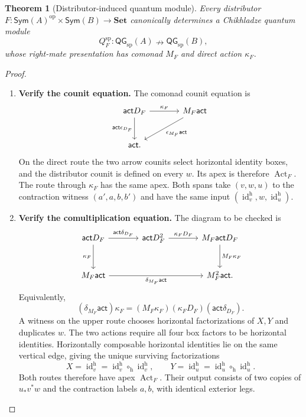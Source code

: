 \documentclass[oneside]{article}
\newcommand{\Sym}{\mathsf{Sym}}
\newcommand{\QG}{\mathsf{QG}}
\newcommand{\id}{\operatorname{id}}
\newcommand{\op}{\mathrm{op}}
\newcommand{\xnrightarrow}[1]{\mathrel{\overset{#1}{\nrightarrow}}}
\newcommand{\act}{\mathsf{act}}
\theoremstyle{plain}
\newtheorem{theorem}{Theorem}[section]
\theoremstyle{definition}
\theoremstyle{remark}
\begin{document}
\begin{theorem}[Distributor-induced quantum module]
\label{thm:cgqg-distributor-qmodule}
Every distributor \(F:\Sym(A)^\op\times \Sym(B)\to\mathbf{Set}\) canonically
determines a Chikhladze quantum module
\[
 Q_F^{\mathrm{sp}}:
 \QG_{\mathrm{sp}}(A)\xnrightarrow{}\QG_{\mathrm{sp}}(B),
\]
whose right-mate presentation has comonad \(M_F\) and direct action
\(\kappa_F\).
\end{theorem}
\begin{proof}
    \leavevmode
    \begin{enumerate}[beginpenalty=10000]
        \item \textbf{Verify the counit equation.}
        The comonad counit equation is
        \[
        \begin{tikzcd}[column sep=large,row sep=large]
        \act D_F\arrow[r,"\kappa_F"]\arrow[d,"\act\epsilon_{D_F}"']
          &M_F\act\arrow[dl,"\epsilon_{M_F}\act"]\\
        \act.&
        \end{tikzcd}
        \]
        On the direct route the two arrow counits select horizontal
        identity boxes, and the distributor counit is defined on every
        \(w\). Its apex is therefore \(\operatorname{Act}_F\).
        The route through \(\kappa_F\) has the same apex. Both spans
        take \((v,w,u)\) to the contraction witness \((a',a,b,b')\)
        and have the same input \((\id_v^{\mathrm h},w,\id_u^{\mathrm h})\).

        \item \textbf{Verify the comultiplication equation.}
        The diagram to be checked is
        \[
        \begin{tikzcd}[column sep=large,row sep=large]
        \act D_F\arrow[r,"\act\delta_{D_F}"]\arrow[d,"\kappa_F"']
          &\act D_F^2\arrow[r,"\kappa_F D_F"]
          &M_F\act D_F\arrow[d,"M_F\kappa_F"]\\
        M_F\act\arrow[rr,"\delta_{M_F}\act"']&&M_F^2\act.
        \end{tikzcd}
        \]
        Equivalently,
        \begin{equation}
        (\delta_{M_F}\act)\kappa_F
          =(M_F\kappa_F)(\kappa_FD_F)(\act\delta_{D_F}).
        \label{eq:cgqg-direct-action-comultiplication}
        \end{equation}
        A witness on the upper route chooses horizontal factorizations
        of \(X,Y\) and duplicates \(w\). The two actions require all
        four box factors to be horizontal identities. Horizontally
        composable horizontal identities lie on the same vertical edge,
        giving the unique surviving factorizations
        \[
        X=\id_v^{\mathrm h}=\id_v^{\mathrm h}\circ_{\mathrm h}\id_v^{\mathrm h},\qquad
        Y=\id_u^{\mathrm h}=\id_u^{\mathrm h}\circ_{\mathrm h}\id_u^{\mathrm h}.
        \]
        Both routes therefore have apex \(\operatorname{Act}_F\).
        Their output consists of two copies of \(u_*v^*w\) and the
        contraction labels \(a,b\), with identical exterior legs.


\end{enumerate}
\end{proof}
\end{document}
